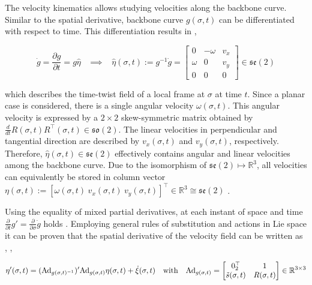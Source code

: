 The velocity kinematics allows studying velocities along the backbone curve. Similar to the spatial derivative, backbone curve $g(\sigma,t)$ can be differentiated with respect to time. This differentiation results in \cite{Caasenbrood2020}, 

\begin{equation}
  \Dot{g} = \frac{\partial g}{\partial t} = g \hat{\eta} \hspace{10pt} \implies \hspace{10pt}  \hat{\eta}(\sigma,t) := g^{-1}\dot{g} = \begin{bmatrix} 0 & -\omega & v_x \\ \omega & 0 & v_y \\
  0& 0 & 0 \end{bmatrix} \in  \mathfrak{se}(2)
    \label{eq2:dgdt}
\end{equation}

which describes the time-twist field of a local frame at $\sigma$ at time $t$. Since a planar case is considered, there is a single angular velocity $\omega(\sigma,t)$. This angular velocity is expressed by a $2 \times 2$ skew-symmetric matrix obtained by $\frac{d}{dt}R(\sigma,t)R^\top(\sigma,t) \in \mathfrak{so}(2)$. The linear velocities in perpendicular and tangential direction are described by $v_x(\sigma,t)$ and $v_y(\sigma,t)$, respectively. Therefore, $\hat{\eta}(\sigma,t) \in \mathfrak{se}(2)$ effectively contains angular and linear velocities among the backbone curve. Due to the isomorphism of $\mathfrak{se}(2) \longmapsto \mathbb{R}^3$, all velocities can equivalently be stored in column vector $\eta(\sigma,t) := [\omega(\sigma,t) \hspace{3pt} v_x(\sigma,t) \hspace{3pt} v_y(\sigma,t)]^\top \in \mathbb{R}^3 \cong \mathfrak{se}(2)$ \cite{Sola2018}.


Using the equality of mixed partial derivatives, at each instant of space and time $\frac{\partial}{\partial t}g' = \frac{\partial}{\partial \sigma}\dot{g}$ holds \cite{Caasenbrood2020}. Employing general rules of substitution and actions in Lie space it can be proven that the spatial derivative of the velocity field can be written as \cite{Caasenbrood2020}, \cite{Boyer2019},

\begin{equation}
    \eta'(\sigma,t)= (\text{Ad}_{g(\sigma,t)^{-1}})'\text{Ad}_{g(\sigma,t)} \eta(\sigma,t) + \Dot{\xi}(\sigma,t) \hspace{10pt} \text{with} \hspace{10pt} \text{Ad}_{g(\sigma,t)} = \begin{bmatrix} 0_2^\top & 1 \\ \Tilde{s}(\sigma,t) & R(\sigma,t)  \end{bmatrix} \in \mathbb{R}^{3\times 3}
    \label{eq2:etadif}
\end{equation}


